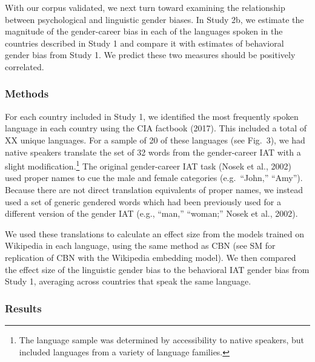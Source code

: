 \documentclass[man]{apa6}
\let\rmarkdownfootnote\footnote%
\def\footnote{\protect\rmarkdownfootnote}
\theoremstyle{definition}
\theoremstyle{definition}
\theoremstyle{definition}
\theoremstyle{remark}
\begin{document}
With our corpus validated, we next turn toward examining the
relationship between psychological and linguistic gender biases. In
Study 2b, we estimate the magnitude of the gender-career bias in each of
the languages spoken in the countries described in Study 1 and compare
it with estimates of behavioral gender bias from Study 1. We predict
these two measures should be positively correlated.

\subsubsection{Methods}\label{methods-2}

For each country included in Study 1, we identified the most frequently
spoken language in each country using the CIA factbook (2017). This
included a total of XX unique languages. For a sample of 20 of these
languages (see Fig.~3), we had native speakers translate the set of 32
words from the gender-career IAT with a slight
modification.\footnote{The language sample was determined by accessibility to native speakers, but included languages from a variety of language families.}
The original gender-career IAT task (Nosek et al., 2002) used proper
names to cue the male and female categories (e.g.~\enquote{John,}
\enquote{Amy}). Because there are not direct translation equivalents of
proper names, we instead used a set of generic gendered words which had
been previously used for a different version of the gender IAT (e.g.,
``man,'' ``woman;'' Nosek et al., 2002).

We used these translations to calculate an effect size from the models
trained on Wikipedia in each language, using the same method as CBN (see
SM for replication of CBN with the Wikipedia embedding model). We then
compared the effect size of the linguistic gender bias to the behavioral
IAT gender bias from Study 1, averaging across countries that speak the
same language.

\subsubsection{Results}\label{results-2}
\end{document}
